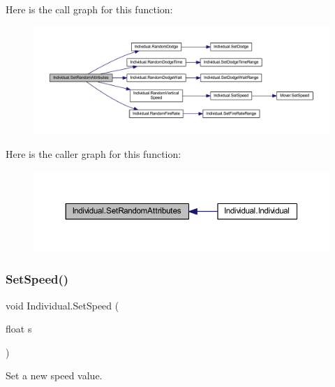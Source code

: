 Here is the call graph for this function\+:\nopagebreak
\begin{figure}[H]
\begin{center}
\leavevmode
\includegraphics[width=350pt]{class_individual_aad9008e000af2bf09346be0ca9258116_cgraph}
\end{center}
\end{figure}
Here is the caller graph for this function\+:\nopagebreak
\begin{figure}[H]
\begin{center}
\leavevmode
\includegraphics[width=350pt]{class_individual_aad9008e000af2bf09346be0ca9258116_icgraph}
\end{center}
\end{figure}
\mbox{\label{class_individual_a106bf8917e8f55075f01e39e9c7e2264}} 
\subsubsection{\texorpdfstring{Set\+Speed()}{SetSpeed()}}
{\footnotesize\ttfamily void Individual.\+Set\+Speed (\begin{DoxyParamCaption}\item[{float}]{s }\end{DoxyParamCaption})}



Set a new speed value. 


